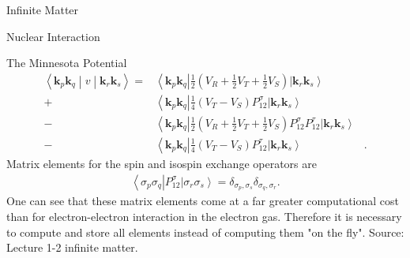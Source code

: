 \documentclass[twoside,english]{uiofysmaster}
\begin{document}
\begin{chapter}{Infinite Matter}
\begin{section}{Nuclear Interaction}
\begin{subsection}{The Minnesota Potential}
			\begin{align}
				\left<\mathbf{k}_p \mathbf{k}_q \middle| v \middle| \mathbf{k}_r \mathbf{k}_s \right> = 
				&\left<\mathbf{k}_p \mathbf{k}_q \right| \frac{1}{2} \left( V_R + \frac{1}{2} V_T + \frac{1}{2} V_S \right) \left| \mathbf{k}_r \mathbf{k}_s \right>   \\
				+&\left<\mathbf{k}_p \mathbf{k}_q \right| \frac{1}{4} (V_T - V_S) P_{12}^\sigma \left| \mathbf{k}_r \mathbf{k}_s \right> \nonumber \\
				-&\left<\mathbf{k}_p \mathbf{k}_q \right| \frac{1}{2} \left( V_R + \frac{1}{2} V_T + \frac{1}{2} V_S \right) P_{12}^\sigma P_{12}^\tau \left| \mathbf{k}_r \mathbf{k}_s \right> \nonumber \\
				-&\left<\mathbf{k}_p \mathbf{k}_q \right| \frac{1}{4}(V_T - V_S) P_{12}^\tau  \left| \mathbf{k}_r \mathbf{k}_s \right>&. \nonumber
			\end{align}
			Matrix elements for the spin and isospin exchange operators are 
			\begin{align}
				\left< \sigma_p \sigma_q \right| P_{12}^\sigma \left| \sigma_r \sigma_s \right> = \delta_{\sigma_p,\sigma_s} \delta_{\sigma_q,\sigma_r}.
			\end{align}
			One can see that these matrix elements come at a far greater computational cost than for electron-electron interaction in the electron gas. Therefore it is necessary to compute and store all elements instead of computing them "on the fly". Source: Lecture 1-2 infinite matter. 
		\end{subsection}
		
	\end{section}

\end{chapter}
\end{document}
